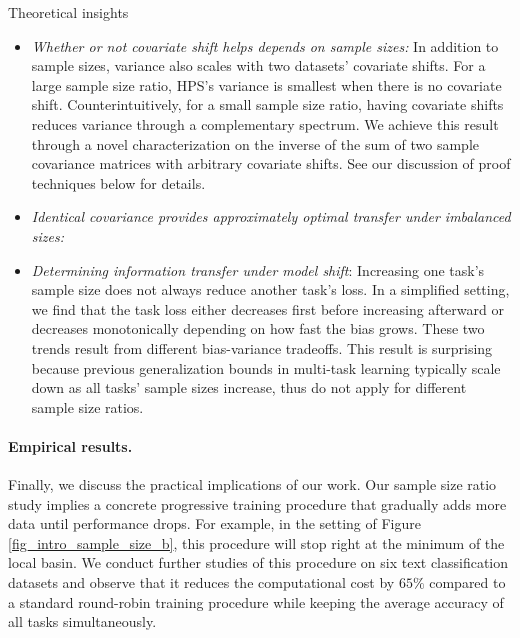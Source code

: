Theoretical insights
\begin{itemize}
    \item \textit{Whether or not covariate shift helps depends on sample sizes:} In addition to sample sizes, variance also scales with two datasets' covariate shifts. For a large sample size ratio, HPS's  variance is smallest when there is no covariate shift. Counterintuitively, for a small sample size ratio, having covariate shifts reduces variance through a complementary spectrum. We achieve this result through a novel characterization on the inverse of the sum of two sample covariance matrices with arbitrary covariate shifts. See our discussion of proof techniques below for details.
    \item \textit{Identical covariance provides approximately optimal transfer under imbalanced sizes:}
    \item \textit{Determining information transfer under model shift}: Increasing one task's sample size does not always reduce another task's loss. In a simplified setting, we find that the task loss either decreases first before increasing afterward or decreases monotonically depending on how fast the bias grows. These two trends result from different bias-variance tradeoffs. This result is surprising because previous generalization bounds in multi-task learning typically scale down as all tasks' sample sizes increase, thus do not apply for different sample size ratios.
\end{itemize}

\paragraph{Empirical results.}
Finally, we discuss the practical implications of our work.
Our sample size ratio study implies a concrete progressive training procedure that gradually adds more data until performance drops.
For example, in the setting of Figure \ref{fig_intro_sample_size_b}, this procedure will stop right at the minimum of the local basin.
We conduct further studies of this procedure on six text classification datasets and observe that it reduces the computational cost by $65\%$ compared to a standard round-robin training procedure while keeping the average accuracy of all tasks simultaneously.


